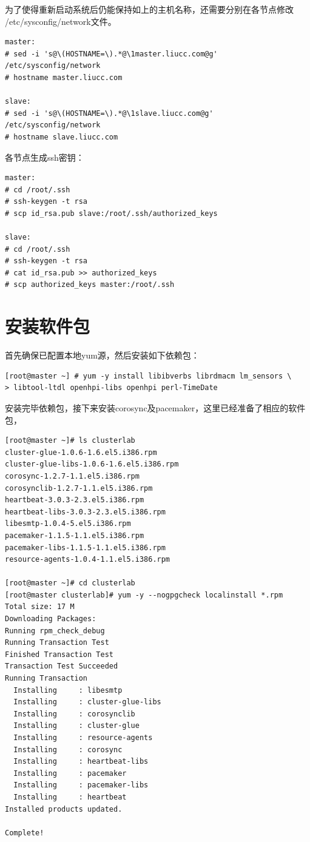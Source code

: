 为了使得重新启动系统后仍能保持如上的主机名称，还需要分别在各节点修改
/etc/sysconfig/network文件。

\begin{verbatim}
master:
# sed -i 's@\(HOSTNAME=\).*@\1master.liucc.com@g'  /etc/sysconfig/network
# hostname master.liucc.com

slave:
# sed -i 's@\(HOSTNAME=\).*@\1slave.liucc.com@g' /etc/sysconfig/network
# hostname slave.liucc.com
\end{verbatim}

各节点生成ssh密钥：

\begin{verbatim}
master:
# cd /root/.ssh
# ssh-keygen -t rsa
# scp id_rsa.pub slave:/root/.ssh/authorized_keys

slave:
# cd /root/.ssh
# ssh-keygen -t rsa
# cat id_rsa.pub >> authorized_keys
# scp authorized_keys master:/root/.ssh
\end{verbatim}

\section{安装软件包}

首先确保已配置本地yum源，然后安装如下依赖包：

\begin{verbatim}
[root@master ~] # yum -y install libibverbs librdmacm lm_sensors \
> libtool-ltdl openhpi-libs openhpi perl-TimeDate
\end{verbatim}

安装完毕依赖包，接下来安装corosync及pacemaker，这里已经准备了相应的软件包，

\begin{verbatim}
[root@master ~]# ls clusterlab
cluster-glue-1.0.6-1.6.el5.i386.rpm       
cluster-glue-libs-1.0.6-1.6.el5.i386.rpm  
corosync-1.2.7-1.1.el5.i386.rpm           
corosynclib-1.2.7-1.1.el5.i386.rpm        
heartbeat-3.0.3-2.3.el5.i386.rpm          
heartbeat-libs-3.0.3-2.3.el5.i386.rpm
libesmtp-1.0.4-5.el5.i386.rpm
pacemaker-1.1.5-1.1.el5.i386.rpm
pacemaker-libs-1.1.5-1.1.el5.i386.rpm
resource-agents-1.0.4-1.1.el5.i386.rpm

[root@master ~]# cd clusterlab
[root@master clusterlab]# yum -y --nogpgcheck localinstall *.rpm
Total size: 17 M
Downloading Packages:
Running rpm_check_debug
Running Transaction Test
Finished Transaction Test
Transaction Test Succeeded
Running Transaction
  Installing     : libesmtp
  Installing     : cluster-glue-libs
  Installing     : corosynclib
  Installing     : cluster-glue
  Installing     : resource-agents 
  Installing     : corosync
  Installing     : heartbeat-libs
  Installing     : pacemaker
  Installing     : pacemaker-libs 
  Installing     : heartbeat
Installed products updated.

Complete!
\end{verbatim}

